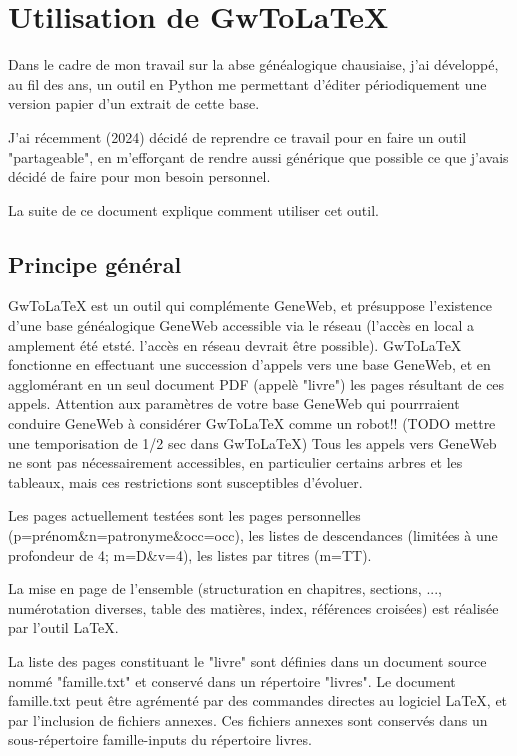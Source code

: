 
\section{Utilisation de GwToLaTeX}

Dans le cadre de mon travail sur la abse généalogique chausiaise, j'ai développé,
au fil des ans, un outil en Python me permettant d'éditer périodiquement une
version papier d'un extrait de cette base.

J'ai récemment (2024) décidé de reprendre ce travail pour en faire un outil
"partageable", en m'efforçant de rendre aussi générique que possible ce que j'avais
décidé de faire pour mon besoin personnel.

La suite de ce document explique comment utiliser cet outil.

\subsection{Principe général}

GwToLaTeX est un outil qui complémente GeneWeb, et présuppose l'existence d'une
base généalogique GeneWeb accessible via le réseau (l'accès en local a amplement
été etsté. l'accès en réseau devrait être possible).
GwToLaTeX fonctionne en effectuant une succession d'appels vers une base GeneWeb,
et en agglomérant en un seul document PDF (appelè "livre") les pages résultant
de ces appels. Attention aux paramètres de votre base GeneWeb qui pourrraient
conduire GeneWeb à considérer GwToLaTeX comme un robot!!
(TODO mettre une temporisation de 1/2 sec dans GwToLaTeX)
Tous les appels vers GeneWeb ne sont pas nécessairement accessibles, en
particulier certains arbres et les tableaux, mais ces restrictions sont
susceptibles d'évoluer.

Les pages actuellement testées sont les pages personnelles
(p=prénom\&n=patronyme\&occ=occ), les listes de descendances (limitées à
une profondeur de 4; m=D\&v=4), les listes par titres (m=TT).

La mise en page de l'ensemble (structuration en chapitres, sections, ...,
numérotation diverses, table des matières, index, références croisées)
est réalisée par l'outil LaTeX.

La liste des pages constituant le "livre" sont définies dans un document source
nommé "famille.txt" et conservé dans un répertoire "livres".
Le document famille.txt peut être agrémenté par des commandes directes au
logiciel LaTeX, et par l'inclusion de fichiers annexes. Ces fichiers annexes
sont conservés dans un sous-répertoire famille-inputs du répertoire livres.

